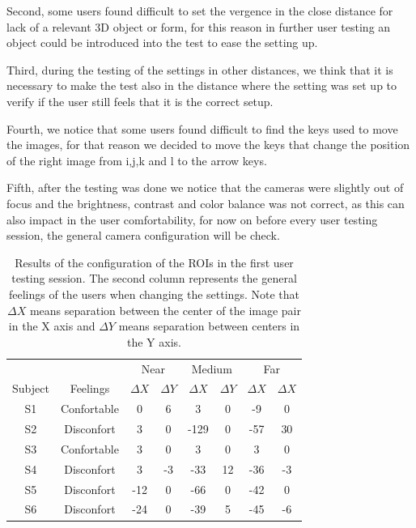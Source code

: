 \documentclass[10pt,a4paper,twocolumn,twoside]{article}
\begin{document}
	Second, some users found difficult to set the vergence in the close distance for lack of a relevant 3D object or form, for this reason in further user testing an object could be introduced into the test to ease the setting up. 
	
	Third, during the testing of the settings in other distances, we think that it is necessary to make the test also in the distance where the setting was set up to verify if the user still feels that it is the correct setup. 
	
	Fourth, we notice that some users found difficult to find the keys used to move the images, for that reason we decided to move the keys that change the position of the right image from i,j,k and l to the arrow keys. 
	
	Fifth, after the testing was done we notice that the cameras were slightly out of focus and the brightness, contrast and color balance was not correct, as this can also impact in the user comfortability, for now on before every user testing session, the general camera configuration will be check.
	
	
	\begin{table}
		\begin{center}
			\begin{tabular}{cccccccc}
				\toprule
				& & \multicolumn{2}{c}{Near} & \multicolumn{2}{c}{Medium} & \multicolumn{2}{c}{Far} \\ 
				Subject &Feelings & $\Delta X$ & $\Delta Y$ & $\Delta X$ & $\Delta Y$ & $\Delta X$ & $\Delta X$ \\ 
				\midrule
				S1&Confortable & 0 & 6 & 3 & 0 & -9 & 0 \\ 
				\midrule 
				S2&Disconfort & 3 & 0 & -129 & 0 & -57 & 30 \\ 
				\midrule
				S3&Confortable & 3 & 0 & 3 & 0 & 3 & 0 \\ 
				\midrule 
				S4&Disconfort & 3 & -3 & -33 & 12 & -36 & -3 \\ 
				\midrule
				S5&Disconfort & -12 & 0 & -66 & 0 & -42 & 0 \\ 
				\midrule
				S6&Disconfort & -24 & 0 & -39 & 5 & -45 & -6 \\ 
				\bottomrule
			\end{tabular} 
			\caption{Results of the configuration of the ROIs in the first user testing session. The second column represents the general feelings of the users when changing the settings. Note that $\Delta X$ means separation between the center of the image pair in the X axis and $\Delta Y$ means separation between centers in the Y axis.}
			\label{tab:firstUserTestResults}
		\end{center}
	\end{table}
	
\end{document}
